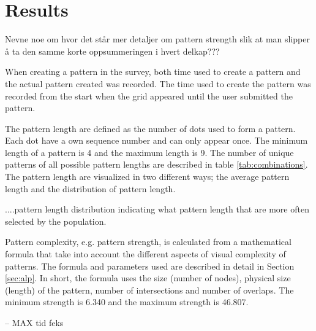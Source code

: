 \chapter{Results}\label{chap:results}

	Nevne noe om hvor det står mer detaljer om pattern strength slik at man slipper å ta den samme korte oppsummeringen i hvert delkap???

	When creating a pattern in the survey, both time used to create a pattern and the actual pattern created was recorded. The time used to create the pattern was recorded from the start when the grid appeared until the user submitted the pattern.

	The pattern length are defined as the number of dots used to form a pattern. Each dot have a own sequence number and can only appear once. The minimum length of a pattern is 4 and the maximum length is 9. The number of unique patterns of all possible pattern lengths are described in table \ref{tab:combinations}. The pattern length are visualized in two different ways; the average pattern length and the distribution of pattern length.

	....pattern length distribution indicating what pattern length that are more often selected by the population.

	Pattern complexity, e.g. pattern strength, is calculated from a mathematical formula that take into account the different aspects of visual complexity of patterns. The formula and parameters used are described in detail in Section \ref{sec:alp}. In short, the formula uses the size (number of nodes), physical size (length) of the pattern, number of intersections and number of overlaps. The minimum strength is 6.340 and the maximum strength is 46.807.

	-- MAX tid feks 


	